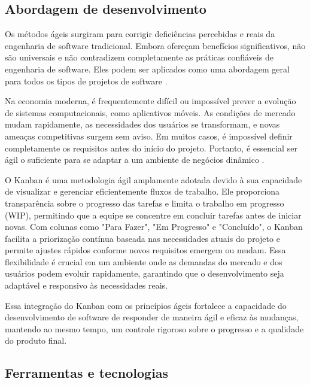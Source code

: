 
\subsection{Abordagem de desenvolvimento}


Os métodos ágeis surgiram para corrigir deficiências percebidas e reais da engenharia de software tradicional. Embora ofereçam benefícios significativos, não são universais e não contradizem completamente as práticas confiáveis de engenharia de software. Eles podem ser aplicados como uma abordagem geral para todos os tipos de projetos de software \cite{pressman}.

Na economia moderna, é frequentemente difícil ou impossível prever a evolução de sistemas computacionais, como aplicativos móveis. As condições de mercado mudam rapidamente, as necessidades dos usuários se transformam, e novas ameaças competitivas surgem sem aviso. Em muitos casos, é impossível definir completamente os requisitos antes do início do projeto. Portanto, é essencial ser ágil o suficiente para se adaptar a um ambiente de negócios dinâmico \cite{pressman}.

O Kanban é uma metodologia ágil amplamente adotada devido à sua capacidade de visualizar e gerenciar eficientemente fluxos de trabalho. Ele proporciona transparência sobre o progresso das tarefas e limita o trabalho em progresso (WIP), permitindo que a equipe se concentre em concluir tarefas antes de iniciar novas. Com colunas como "Para Fazer", "Em Progresso" e "Concluído", o Kanban facilita a priorização contínua baseada nas necessidades atuais do projeto e permite ajustes rápidos conforme novos requisitos emergem ou mudam. Essa flexibilidade é crucial em um ambiente onde as demandas do mercado e dos usuários podem evoluir rapidamente, garantindo que o desenvolvimento seja adaptável e responsivo às necessidades reais.

Essa integração do Kanban com os princípios ágeis fortalece a capacidade do desenvolvimento de software de responder de maneira ágil e eficaz às mudanças, mantendo ao mesmo tempo, um controle rigoroso sobre o progresso e a qualidade do produto final.

\subsection{Ferramentas e tecnologias}

